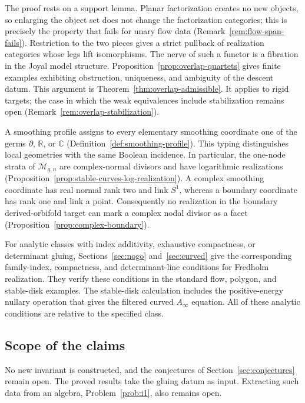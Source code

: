 \documentclass[11pt,letterpaper,twoside]{article}
\theoremstyle{plain}
\theoremstyle{definition}
\theoremstyle{remark}
\newcommand{\Ainf}{A_\infty}
\begin{document}
The proof rests on a support lemma.  Planar factorization creates no new objects, so enlarging the object set does not change the factorization categories; this is precisely the property that fails for unary flow data (Remark~\ref{rem:flow-span-fails}).  Restriction to the two pieces gives a strict pullback of realization categories whose legs lift isomorphisms.  The nerve of such a functor is a fibration in the Joyal model structure.  Proposition~\ref{prop:overlap-quartets} gives finite examples exhibiting obstruction, uniqueness, and ambiguity of the descent datum.  This argument is Theorem~\ref{thm:overlap-admissible}.  It applies to rigid targets; the case in which the weak equivalences include stabilization remains open (Remark~\ref{rem:overlap-stabilization}).

A smoothing profile assigns to every elementary smoothing coordinate one of the germs \(\partial\), \(\mathbb R\), or \(\mathbb C\) (Definition~\ref{def:smoothing-profile}).  This typing distinguishes local geometries with the same Boolean incidence.  In particular, the one-node strata of \(\overline{\mathcal M}_{g,n}\) are complex-normal divisors and have logarithmic realizations (Proposition~\ref{prop:stable-curves-log-realization}).  A complex smoothing coordinate has real normal rank two and link \(S^1\), whereas a boundary coordinate has rank one and link a point.  Consequently no realization in the boundary derived-orbifold target can mark a complex nodal divisor as a facet (Proposition~\ref{prop:complex-boundary}).

For analytic classes with index additivity, exhaustive compactness, or determinant gluing, Sections~\ref{sec:nogo} and~\ref{sec:curved} give the corresponding family-index, compactness, and determinant-line conditions for Fredholm realization.  They verify these conditions in the standard flow, polygon, and stable-disk examples.  The stable-disk calculation includes the positive-energy nullary operation that gives the filtered curved \(\Ainf\) equation.  All of these analytic conditions are relative to the specified class.

\subsection{Scope of the claims}\label{sec:not-claimed}

No new invariant is constructed, and the conjectures of Section~\ref{sec:conjectures} remain open.  The proved results take the gluing datum as input.  Extracting such data from an algebra, Problem~\ref{prob:i1}, also remains open.
\end{document}
